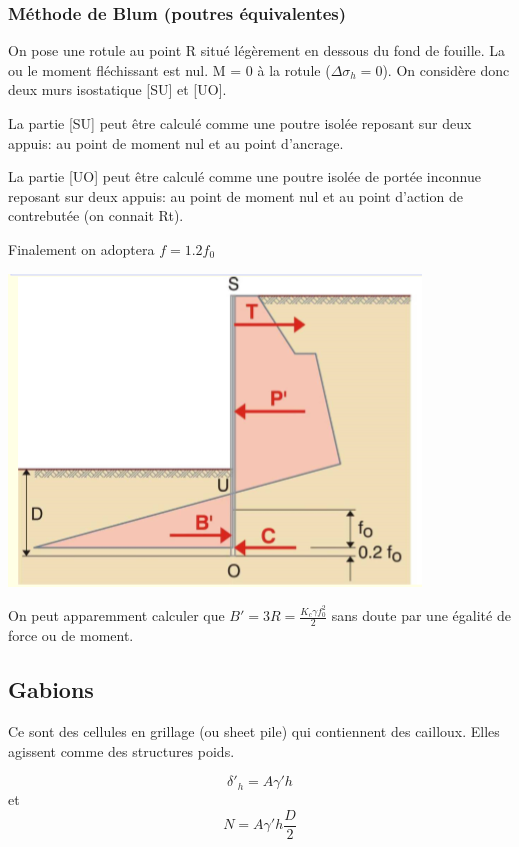 \subsubsection{Méthode de Blum (poutres équivalentes)}

On pose une rotule au point R situé légèrement en dessous du fond de fouille. La ou le moment fléchissant est nul. M = 0 à la rotule ($\Delta \sigma_h = 0$). On considère donc deux murs isostatique [SU] et [UO].

La partie [SU] peut être calculé comme une poutre isolée reposant sur deux appuis: au point de moment nul et au point d'ancrage.

La partie [UO] peut être calculé comme une poutre isolée de portée inconnue reposant sur deux appuis: au point de moment nul et au point d'action de contrebutée (on connait Rt).

Finalement on adoptera $f=1.2f_0$

\begin{center}
\includegraphics [scale=0.8]{pictures/43.PNG}
\end{center}

On peut apparemment calculer que $B'=3R=\frac{K_c \gamma f_0^2}{2}$ sans doute par une égalité de force ou de moment.

\subsection{Gabions}

Ce sont des cellules en grillage (ou sheet pile) qui contiennent des cailloux. Elles agissent comme des structures poids.

$$ \delta'_h = A \gamma' h $$   et    $$ N=A \gamma'h\frac{D}{2}$$ 

